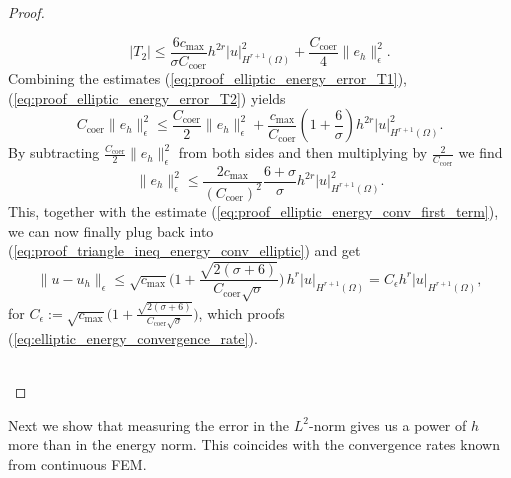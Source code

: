 \begin{proof}
\begin{proofstep}
		\begin{equation}
			\label{eq:proof_elliptic_energy_error_T2}
			|T_2| \leq \frac{6 c_{\max}}{\sigma C_{\text{coer}}} h^{2r} |u|^2_{H^{r+1}(\Omega)} + \frac{C_{\text{coer}}}{4} \|e_h\|_{\epsilon}^2.
		\end{equation}
		Combining the estimates (\ref{eq:proof_elliptic_energy_error_T1}), (\ref{eq:proof_elliptic_energy_error_T2}) yields
		\begin{equation}
			\label{eq:proof_elliptic_energy_comb_T1_T2_estimate_of_eh_with_coerc}
			C_{\text{coer}} \|e_h\|_{\epsilon}^2 \leq \frac{C_{\text{coer}}}{2} \|e_h\|_{\epsilon}^2 + \frac{c_{\max}}{C_{\text{coer}}}(1 + \frac{6}{\sigma}) h^{2r} |u|^2_{H^{r+1}(\Omega)}. \nonumber
		\end{equation}
		By subtracting $\frac{C_{\text{coer}}}{2} \| e_h\|_{\epsilon}^2$ from both sides
		and then multiplying by $\frac{2}{C_{\text{coer}}} $ we find 
		\begin{equation}
			\| e_h\|_{\epsilon}^2 \leq \frac{2c_{\max}}{(C_{\text{coer}})^2} \frac{6 + \sigma}{\sigma} h^{2r} |u|^2_{H^{r+1}(\Omega)}. \nonumber
		\end{equation}
		This, together with the estimate (\ref{eq:proof_elliptic_energy_conv_first_term}), we can now finally plug back into (\ref{eq:proof_triangle_ineq_energy_conv_elliptic}) and get
		\begin{equation*}
			\|u - u_h \|_{\epsilon} \leq \sqrt{c_{\max}}\Big(1 + \frac{\sqrt{2(\sigma + 6)}}{C_{\text{coer}}\sqrt{\sigma}}\Big) \, h^r |u|_{H^{r+1}(\Omega)}
			= C_{\epsilon} h^r |u|_{H^{r+1}(\Omega)},
		\end{equation*}
		for $\displaystyle C_{\epsilon} :=  \sqrt{c_{\max}}\Big(1 + \frac{\sqrt{2(\sigma + 6)}}{C_{\text{coer}}\sqrt{\sigma}}\Big)$, which proofs (\ref{eq:elliptic_energy_convergence_rate}).
	\end{proofstep}
	\\
\end{proof}

Next we show that measuring the error in the $L^2$-norm gives us a power of $h$ more than in the energy norm. This coincides with the convergence rates known from
continuous FEM. 

